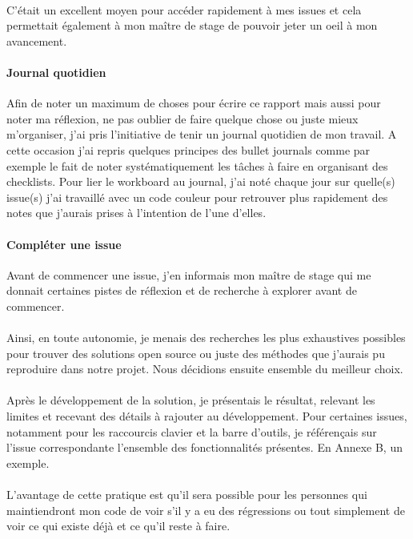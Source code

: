 \documentclass[12pt]{article}
\begin{document}
\paragraph{}
C'était un excellent moyen pour accéder rapidement à mes issues et cela permettait également à mon maître de stage de pouvoir jeter un oeil à mon avancement.\\

\paragraph{Journal quotidien}
Afin de noter un maximum de choses pour écrire ce rapport mais aussi pour noter ma réflexion, ne pas oublier de faire quelque chose ou juste mieux m'organiser, j'ai pris l'initiative de tenir un journal quotidien de mon travail. A cette occasion j'ai repris quelques principes des bullet journals comme par exemple le fait de noter systématiquement les tâches à faire en organisant des checklists. Pour lier le workboard au journal, j'ai noté chaque jour sur quelle(s) issue(s) j'ai travaillé avec un code couleur pour retrouver plus rapidement des notes que j'aurais prises à l'intention de l'une d'elles.\\

\paragraph{Compléter une issue}
Avant de commencer une issue, j'en informais mon maître de stage qui me donnait certaines pistes de réflexion et de recherche à explorer avant de commencer.
\paragraph{}
Ainsi, en toute autonomie, je menais des recherches les plus exhaustives possibles pour trouver des solutions open source ou juste des méthodes que j'aurais pu reproduire dans notre projet. Nous décidions ensuite ensemble du meilleur choix.
\paragraph{}
Après le développement de la solution, je présentais le résultat, relevant les limites et recevant des détails à rajouter au développement. Pour certaines issues, notamment pour les raccourcis clavier et la barre d'outils, je référençais sur l'issue correspondante l'ensemble des fonctionnalités présentes. En Annexe B, un exemple.
\paragraph{}
L'avantage de cette pratique est qu'il sera possible pour les personnes qui maintiendront mon code de voir s'il y a eu des régressions ou tout simplement de voir ce qui existe déjà et ce qu'il reste à faire.\\
\end{document}
